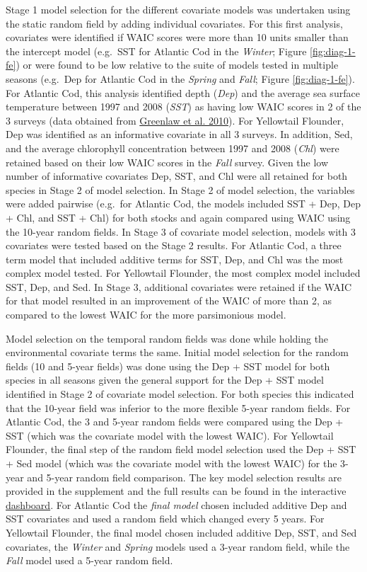\documentclass[
]{article}
\begin{document}
Stage 1 model selection for the different covariate models was undertaken using the static random field by adding individual covariates. For this first analysis, covariates were identified if WAIC scores were more than 10 units smaller than the intercept model (e.g.~SST for Atlantic Cod in the \emph{Winter}; Figure \ref{fig:diag-1-fe}) or were found to be low relative to the suite of models tested in multiple seasons (e.g.~Dep for Atlantic Cod in the \emph{Spring} and \emph{Fall}; Figure \ref{fig:diag-1-fe}). For Atlantic Cod, this analysis identified depth (\emph{Dep}) and the average sea surface temperature between 1997 and 2008 (\emph{SST}) as having low WAIC scores in 2 of the 3 surveys (data obtained from \protect\hyperlink{ref-greenlawGeodatabaseHistoricalContemporary2010}{Greenlaw et al. 2010}). For Yellowtail Flounder, Dep was identified as an informative covariate in all 3 surveys. In addition, Sed, and the average chlorophyll concentration between 1997 and 2008 (\emph{Chl}) were retained based on their low WAIC scores in the \emph{Fall} survey. Given the low number of informative covariates Dep, SST, and Chl were all retained for both species in Stage 2 of model selection. In Stage 2 of model selection, the variables were added pairwise (e.g.~for Atlantic Cod, the models included SST + Dep, Dep + Chl, and SST + Chl) for both stocks and again compared using WAIC using the 10-year random fields. In Stage 3 of covariate model selection, models with 3 covariates were tested based on the Stage 2 results. For Atlantic Cod, a three term model that included additive terms for SST, Dep, and Chl was the most complex model tested. For Yellowtail Flounder, the most complex model included SST, Dep, and Sed. In Stage 3, additional covariates were retained if the WAIC for that model resulted in an improvement of the WAIC of more than 2, as compared to the lowest WAIC for the more parsimonious model.

Model selection on the temporal random fields was done while holding the environmental covariate terms the same. Initial model selection for the random fields (10 and 5-year fields) was done using the Dep + SST model for both species in all seasons given the general support for the Dep + SST model identified in Stage 2 of covariate model selection. For both species this indicated that the 10-year field was inferior to the more flexible 5-year random fields. For Atlantic Cod, the 3 and 5-year random fields were compared using the Dep + SST (which was the covariate model with the lowest WAIC). For Yellowtail Flounder, the final step of the random field model selection used the Dep + SST + Sed model (which was the covariate model with the lowest WAIC) for the 3-year and 5-year random field comparison. The key model selection results are provided in the supplement and the full results can be found in the interactive \href{https://github.com/Dave-Keith/Paper_2_SDMs/tree/master/Dashboard}{dashboard}. For Atlantic Cod the \emph{final model} chosen included additive Dep and SST covariates and used a random field which changed every 5 years. For Yellowtail Flounder, the final model chosen included additive Dep, SST, and Sed covariates, the \emph{Winter} and \emph{Spring} models used a 3-year random field, while the \emph{Fall} model used a 5-year random field.
\end{document}
